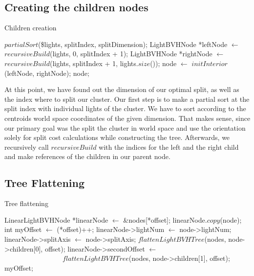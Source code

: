 \subsection{Creating the children nodes}

\begin{algorithm}
	\caption{Children creation}
	\label{alg:childrencreation}
	\begin{algorithmic}[1] %
		\State $partialSort$(\$lights, splitIndex, splitDimension);
		\State LightBVHNode *leftNode $\gets$ $recursiveBuild$(lights, 0, splitIndex + 1);
		\State LightBVHNode *rightNode $\gets$ $recursiveBuild$(lights, splitIndex + 1, lights.$size$());
		\State node $\gets$ $initInterior$(leftNode, rightNode);
		\State \Return node;
		\EndProcedure
	\end{algorithmic}
\end{algorithm}

At this point, we have found out the dimension of our optimal split, as well as the index where to split our cluster. Our first step is to make a partial sort at the split index with individual lights of the cluster. We have to sort according to the centroids world space coordinates of the given dimension. That makes sense, since our primary goal was the split the cluster in world space and use the orientation solely for split cost calculations while constructing the tree. Afterwards, we recursively call $recursiveBuild$ with the indices for the left and the right child and make references of the children in our parent node.

\subsection{Tree Flattening}
\label{subs:flat}

\begin{algorithm}
	\caption{Tree flattening}
	\label{alg:treeflattening}
	\begin{algorithmic}[1] %
		\State LinearLightBVHNode *linearNode $\gets$ \&nodes[*offset];
		\State linearNode.$copy$(node);
		\State int myOffset $\gets$ (*offset)++;
		\State linearNode->lightNum $\gets$ node->lightNum;
		\Else
		\State linearNode->splitAxis $\gets$ node->splitAxis;
		\State $flattenLightBVHTree$(nodes, node->children[0], offset);
		\State linearNode->secondOffset $\gets$ \\ \ \ \ \ \ \ \ \ \ \ \ \ \ \ \ \ \ $flattenLightBVHTree$(nodes, node->children[1], offset);
		\EndIf
		\State \Return myOffset;
		\EndProcedure
	\end{algorithmic}
\end{algorithm}

